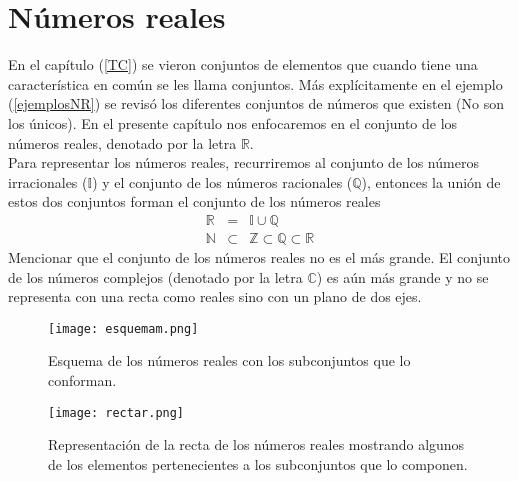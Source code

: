 \chapter{Números reales}
\label{nr}


En el capítulo (\ref{TC}) se vieron conjuntos de elementos que cuando tiene una característica en común se les llama conjuntos. Más explícitamente en el ejemplo (\ref{ejemplosNR}) se revisó los diferentes conjuntos de números que existen (No son los únicos). En el presente capítulo nos enfocaremos en el conjunto de los números reales, denotado por la letra $\mathbb{R}$.\\
Para representar los números reales, recurriremos al conjunto de los números irracionales ($\mathbb{I}$) y el conjunto de los números racionales ($\mathbb{Q}$), entonces la unión de estos dos conjuntos forman el conjunto de los números reales
\begin{eqnarray*}
\mathbb{R}&=&\mathbb{I}\cup \mathbb{Q} \nonumber\\
\mathbb{N}&\subset & \mathbb{Z }\subset \mathbb{Q}\subset \mathbb{R}\nonumber
\end{eqnarray*}
Mencionar que el conjunto de los números reales no es el más grande. El conjunto de los números complejos (denotado por la letra $\mathbb{C}$) es aún más grande y no se representa con una recta como reales sino con un plano de dos ejes.\\ 
\begin{figure}
	\centering
	\texttt{[image: esquemam.png]}
	\caption[Esquema de los números reales]{Esquema de los números reales con los subconjuntos que lo conforman. }
\end{figure}
\begin{figure}
	\centering
	\texttt{[image: rectar.png]}
	\caption[Representación de la recta de los números reales]{Representación de la recta de los números reales mostrando algunos de los elementos pertenecientes a los subconjuntos que lo componen.}
	\label{rectar}
\end{figure}

